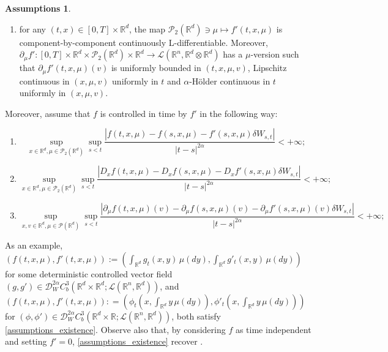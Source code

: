 \documentclass[10pt, a4paper]{article} %
\newcommand{\R}{\mathbb{R}}
\theoremstyle{definition}
\newtheorem{assumptions}[defn]{Assumptions}
\theoremstyle{plain}
\begin{document}
\begin{assumptions}
\begin{enumerate}
        \item for any $(t, x) \in [0, T] \times \mathbb{R}^d$, the map $\mathcal{P}_2 (\mathbb{R}^d) \ni \mu \mapsto f' (t, x, \mu)$ is component-by-component continuously L-differentiable. Moreover, $\partial_{\mu} f' : [0, T]  \times \mathbb{R}^d \times \mathcal{P}_2 (\mathbb{R}^d) \times \mathbb{R}^d \rightarrow \mathscr{L} (\mathbb{R}^n , \mathbb{R}^d \otimes \mathbb{R}^d)$ has a $\mu$-version such that $\partial_{\mu} f' (t, x, \mu) (v)$ is uniformly bounded in $(t, x, \mu, v)$, Lipschitz continuous in $(x, \mu, v)$ uniformly in $t$ and $\alpha$-H\"older continuous in $t$ uniformly in $(x, \mu, v)$. 
  \end{enumerate}
    Moreover, assume that $f$ is controlled in time by $f'$ in the following way: 
  \begin{enumerate} \renewcommand{\labelenumi}{(\alph{enumi})} \setcounter{enumi}{8}
      \item
        \[ \sup_{x \in \mathbb{R}^d, \mu \in \mathcal{P}_2 (\mathbb{R}^d)} \sup_{s < t}  \frac{| f (t, x, \mu) - f (s, x, \mu) - f' (s, x, \mu) \delta W_{s, t} |}{| t - s |^{2 \alpha}} < + \infty ; \]
        
        \item
        \[ \sup_{x \in \mathbb{R}^d, \mu \in \mathcal{P}_2 (\mathbb{R}^d)}  \sup_{s < t}  \frac{| D_x f (t, x, \mu) - D_x f (s, x, \mu) - D_x
           f' (s, x, \mu) \delta W_{s, t} |}{| t - s |^{2 \alpha}} < + \infty ; \]
        \item
        \[ \sup_{x,v \in \mathbb{R}^d, \mu \in \mathcal{P}(\mathbb{R}^d)} \sup_{s < t}  \frac{| \partial_{\mu} f (t, x, \mu) (v) - \partial_{\mu} f (s, x, \mu) (v) - \partial_{\mu} f' (s, x, \mu) (v) \delta W_{s, t} |}{| t - s |^{2 \alpha}} < + \infty ; \]
  \end{enumerate}
\end{assumptions}

\noindent As an example, $(f(t, x,\mu),f'(t, x,\mu)) := (\int_{\R^d} g_t(x,y) \, \mu(dy) , \int_{\R^d} g'_t(x,y) \, \mu(dy))$ for some deterministic controlled vector field $(g,g') \in \mathscr{D}_W^{2\alpha} C_b^3(\R^d \times \R^d; \mathscr{L}(\R^n,\R^d))$, and $(f(t, x,\mu),f'(t, x,\mu)) : = (\phi_t(x,\int_{\R^d} y \, \mu(dy)) , \phi'_t(x,\int_{\R^d} y \, \mu(dy)))$ for $(\phi,\phi') \in \mathscr{D}_W^{2\alpha} C_b^3(\R^d \times \R; \mathscr{L}(\R^n,\R^d))$, both satisfy \cref{assumptions_existence}.
Observe also that, by considering $f$ as time independent and setting $f'=0$, \cref{assumptions_existence} recover \cite[Regularity assumptions 1 and 2]{BCD19}.
\end{document}
